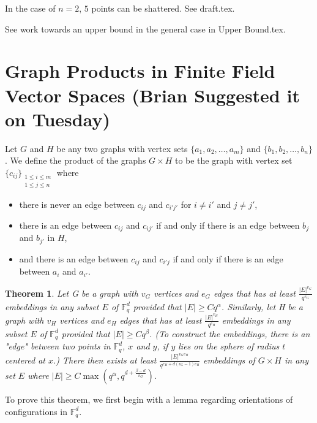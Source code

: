 \documentclass{article}
\newtheorem{theorem}{Theorem}[section]
\begin{document}
In the case of $n=2$, $5$ points can be shattered. See draft.tex.

See work towards an upper bound in the general case in Upper Bound.tex.

\section{Graph Products in Finite Field Vector Spaces (Brian Suggested it on Tuesday)}

Let $G$ and $H$ be any two graphs with vertex sets $\{a_1, a_2, \dots , a_m\}$ and $\{b_1, b_2, \dots, b_n\}$. We define the product of the graphs $G \times H$ to be the graph with vertex set $\{c_{ij}\}_{\substack{1 \le i \le m \\ 1 \le j \le n}}$ where 
\begin{itemize}
    \item there is never an edge between $c_{ij}$ and $c_{i'j'}$ for $i \neq i'$ and $j \neq j'$,
    \item there is an edge between $c_{ij}$ and $c_{ij'}$ if and only if there is an edge between $b_j$ and $b_{j'}$ in $H$,
    \item and there is an edge between $c_{ij}$ and $c_{i'j}$ if and only if there is an edge between $a_i$ and $a_{i'}$.
\end{itemize}
\begin{theorem}
Let G be a graph with $v_G$ vertices and $e_G$ edges that has at least $\frac{|E|^{v_G}}{q^{e_G}}$ embeddings in any subset $E$ of $\mathbb{F}_q^d$ provided that $|E| \ge Cq^{\alpha}$. Similarly, let H be a graph with $v_H$ vertices and $e_H$ edges that has at least $\frac{|E|^{v_H}}{q^{e_H}}$ embeddings in any subset $E$ of $\mathbb{F}_q^d$ provided that $|E| \ge Cq^{\beta}$. (To construct the embeddings, there is an "edge" between two points in $\mathbb{F}_q^d$, $x$ and $y$, if $y$ lies on the sphere of radius $t$ centered at $x$.) There then exists at least $\frac{|E|^{v_Gv_H}}{q^{e_H + d(v_G-1)v_H}}$ embeddings of $G \times H$ in any set $E$ where $|E| \ge C\max(q^{\alpha}, q^{d + \frac{\beta-d}{v_G}})$.
\end{theorem}

To prove this theorem, we first begin with a lemma regarding orientations of configurations in $\mathbb{F}_q^d$.
\end{document}
